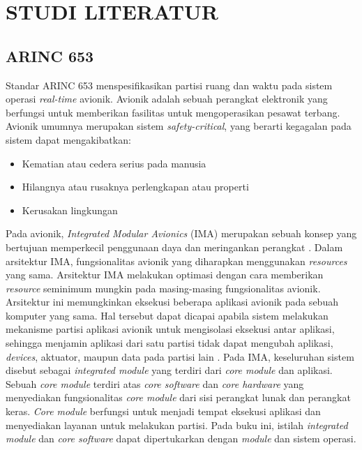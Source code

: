 \chapter{STUDI LITERATUR}

\section{ARINC 653}

Standar ARINC 653 menspesifikasikan partisi ruang dan waktu pada sistem operasi \textit{real-time} avionik.
Avionik adalah sebuah perangkat elektronik yang berfungsi untuk memberikan fasilitas untuk mengoperasikan pesawat terbang.
Avionik umumnya merupakan sistem \textit{safety\hyp critical}, yang berarti kegagalan pada sistem dapat mengakibatkan:
\begin{itemize}
    \item Kematian atau cedera serius pada manusia
    \item Hilangnya atau rusaknya perlengkapan atau properti
    \item Kerusakan lingkungan
\end{itemize}

Pada avionik, \textit{Integrated Modular Avionics} (IMA) merupakan sebuah konsep yang bertujuan memperkecil penggunaan daya dan meringankan perangkat \citep[p.~2.A.2-1]{Garside2009}.
Dalam arsitektur IMA, fungsionalitas avionik yang diharapkan menggunakan \textit{resources} yang sama.
Arsitektur IMA melakukan optimasi dengan cara memberikan \textit{resource} seminimum mungkin pada masing-masing fungsionalitas avionik.
Arsitektur ini memungkinkan eksekusi beberapa aplikasi avionik pada sebuah komputer yang sama.
Hal tersebut dapat dicapai apabila sistem melakukan mekanisme partisi aplikasi avionik untuk mengisolasi eksekusi antar aplikasi, sehingga menjamin aplikasi dari satu partisi tidak dapat mengubah aplikasi, \textit{devices}, aktuator, maupun data pada partisi lain \citep[pp.~11-12]{Rushby2000}.
Pada IMA, keseluruhan sistem disebut sebagai \textit{integrated module} yang terdiri dari \textit{core module} dan aplikasi.
Sebuah \textit{core module} terdiri atas \textit{core software} dan \textit{core hardware} yang menyediakan fungsionalitas \textit{core module} dari sisi perangkat lunak dan perangkat keras.
\textit{Core module} berfungsi untuk menjadi tempat eksekusi aplikasi dan menyediakan layanan untuk melakukan partisi.
Pada buku ini, istilah \textit{integrated module} dan \textit{core software} dapat dipertukarkan dengan \textit{module} dan sistem operasi.

